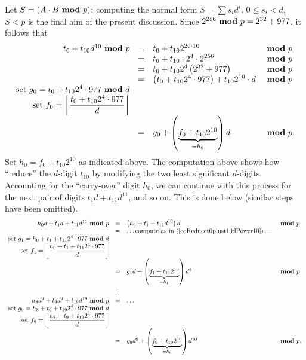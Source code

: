 \documentclass{article}
\renewcommand{\mod}{{~\bf mod~}}
\begin{document}
Let $S = (A\cdot B \mod p)$; computing the normal form $S = \sum s_i d^i$, $0\leq s_i < d$, $S < p$ is the final aim of the present discussion. Since $2^{256} \mod p = 2^{32}+977$, it follows that 
\begin{equation} \label{eqReducet0plust10dPower10}
\begin{array}{rcll}
t_0+ t_{10} d^{10} \mod p 
&=&\displaystyle t_0+t_{10} 2^{26\cdot 10} &\mod p\\
&=&\displaystyle t_0 + t_{10} \cdot 2^4\cdot 2^{256}  &\mod p\\
&=&\displaystyle t_0 + t_{10} 2^4 \left(2^{32} + 977 \right)&\mod p\\
&=&\displaystyle \left(t_0 +t_{10}2^4\cdot 977\right) + t_{10} 2^{10}\cdot d&\mod p \\
\displaystyle \text{set }g_{0} = t_0 +t_{10}2^4\cdot 977 \mod d \\
\displaystyle \text{set }f_{0} =\left\lfloor \frac{t_0 +t_{10}2^4\cdot 977}{d}\right\rfloor \\
&=& g_0 + \left(\underbrace{ f_0+t_{10} 2^{10}}_{=h_0}\right) d &\mod p.
\end{array}
\end{equation}
Set $\displaystyle h_0 = f_0+t_{10} 2^{10}$ as indicated above. The computation above shows how ``reduce'' the $d$-digit $t_{10}$ by modifying the two least significant $d$-digits. Accounting for the ``carry-over'' digit $h_0$, we can continue with this process for the next pair of digits $ t_1 d+t_{11} d^{11}$, and so on. This is done below (similar steps have been omitted).
\[
\begin{array}{rcll}
h_0 d +t_1 d+ t_{11} d^{11} \mod p 
&=&\displaystyle \left(h_0+t_1+t_{11} d^{10}\right) d &\mod p\\
&=& \dots \text{compute as in (\ref{eqReducet0plust10dPower10})} \dots\\
\displaystyle \text{set }g_{1} = h_0+t_1 +t_{11}2^4\cdot 977 \mod d \\
\displaystyle \text{set }f_{1} =\left\lfloor \frac{h_0+t_1 +t_{11}2^4\cdot 977}{d}\right\rfloor \\
&=& g_1d + \left(\underbrace{ f_1+t_{11} 2^{10}}_{=h_1}\right) d^2 &\mod p\\
&\vdots&\\
h_8 d^9 + t_{9} d^9 + t_{19} d^{19}\mod p &=& \dots\\
\displaystyle \text{set }g_{9} = h_8+t_9 +t_{19}2^4\cdot 977 \mod d \\
\displaystyle \text{set }f_{9} =\left\lfloor \frac{h_8+t_9 +t_{19}2^4\cdot 977}{d}\right\rfloor \\
&=&g_9 d^9 + \left( \underbrace{f_9+t_{19} 2^{10}}_{=h_9}\right)d^{10} &\mod p.
\end{array}
\]
\end{document}
